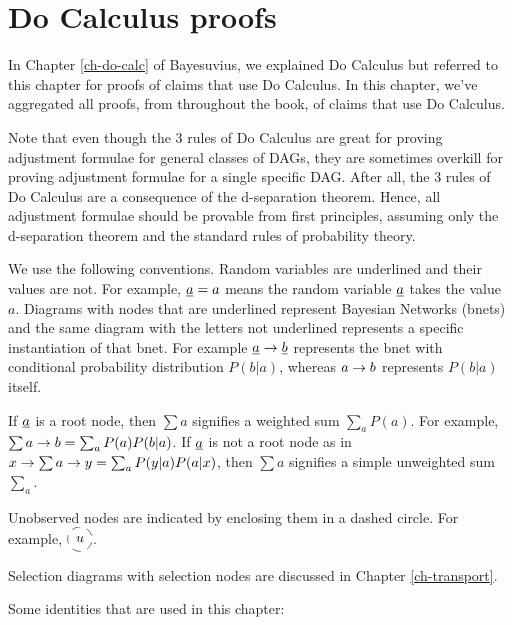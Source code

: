 \chapter{Do Calculus proofs}
\label{ch-do-calc-proofs}

In Chapter \ref{ch-do-calc}
of Bayesuvius,
we explained Do Calculus
but referred to this
chapter for proofs
of claims that
use Do Calculus.
In this chapter, we've
aggregated
 all proofs, from
throughout the book,
of claims that use Do Calculus.

Note that even though the 3
rules of Do Calculus
are great for proving
adjustment formulae
for general classes of DAGs,
they are sometimes overkill
for proving
 adjustment formulae
for a single specific DAG.
After all,  the
 3 rules of Do Calculus
are a consequence
of the d-separation theorem.
Hence, all adjustment
formulae should be
provable from first principles,
assuming only
the d-separation theorem
and the standard rules of
probability theory.

We use the
 following conventions.
Random variables are underlined
and their values are not.
For example, ${\underline{a}}=a$ means
the random variable
${\underline{a}}$ takes the value $a$.
Diagrams
with nodes that are
underlined represent
Bayesian Networks (bnets)
and the same diagram
with the letters not underlined
represents a specific
instantiation of that bnet.
For example ${\underline{a}}\rightarrow{\underline{b}}$
represents the bnet with
conditional probability distribution
$P(b|a)$,
whereas  $a\rightarrow b$
represents $P(b|a)$ itself.

If ${\underline{a}}$ is a root node,
then $\sum a$ signifies
a weighted sum $\sum_a P(a)$.
For example, $\sum a\rightarrow b=\sum_a P(a)P(b|a)$.
If ${\underline{a}}$ is not
a root node
as in $x\rightarrow\sum a \rightarrow y=
\sum_a P(y|a)P(a|x) $, then
$\sum a$ signifies
a simple unweighted sum $\sum_a$.

Unobserved nodes are
indicated by enclosing them
in a dashed circle. For example,
$\xymatrix{*++[F-o]{u}}$.

Selection diagrams
with selection nodes
 are discussed
in Chapter \ref{ch-transport}.
\selectionGraphs

Some identities
that are used in this chapter:

